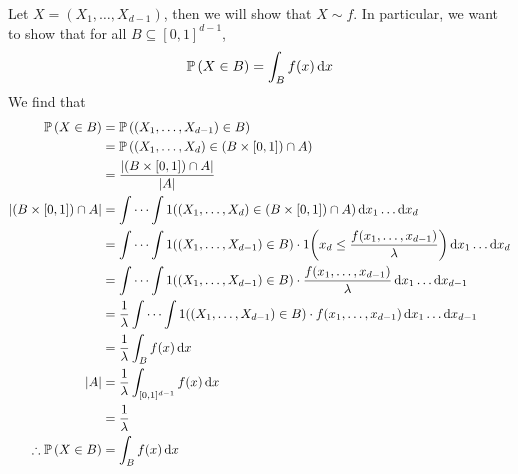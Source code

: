 Let \(X = (X_1, \dots, X_{d-1})\), then we will show that \(X \sim f\).
In particular, we want to show that for all \(B \subseteq [0, 1]^{d-1}\),
\[
	\mathbb{P}\left({X \in B}\right) = \int_B f(x) \dd{x}
\]
We find that
\begin{align*}
	\mathbb{P}\left({X \in B}\right)                 & = \mathbb{P}\left({(X_1, \dots, X_{d-1}) \in B}\right)                                                                                           \\
	                               & = \mathbb{P}\left({(X_1, \dots, X_d) \in (B \times [0, 1]) \cap A}\right)                                                                        \\
	                               & = \frac{\abs{(B \times [0, 1]) \cap A}}{\abs{A}}                                                                               \\
	\abs{(B \times [0, 1]) \cap A} & = \idotsint 1((X_1, \dots, X_d) \in (B \times [0, 1]) \cap A) \dd{x_1} \dots \dd{x_d}                                          \\
	                               & = \idotsint 1((X_1, \dots, X_{d-1}) \in B)\cdot 1\qty(x_d \leq \frac{f(x_1, \dots, x_{d-1})}{\lambda}) \dd{x_1} \dots \dd{x_d} \\
	                               & = \idotsint 1((X_1, \dots, X_{d-1}) \in B)\cdot \frac{f(x_1, \dots, x_{d-1})}{\lambda} \dd{x_1} \dots \dd{x_{d-1}}             \\
	                               & = \frac{1}{\lambda} \idotsint 1((X_1, \dots, X_{d-1}) \in B)\cdot f(x_1, \dots, x_{d-1}) \dd{x_1} \dots \dd{x_{d-1}}           \\
	                               & = \frac{1}{\lambda} \int_B f(x) \dd{x}                                                                                         \\
	\abs{A}                        & = \frac{1}{\lambda} \int_{[0,1]^{d-1}} f(x) \dd{x}                                                                             \\
	                               & = \frac{1}{\lambda}                                                                                                            \\
	\therefore \mathbb{P}\left({X \in B}\right)      & = \int_B f(x) \dd{x}
\end{align*}
